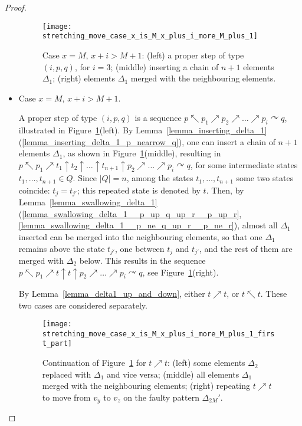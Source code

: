 \documentclass[12pt,a4paper]{article}
\theoremstyle{definition}
\begin{document}
\begin{proof}
\begin{itemize}
\begin{figure}[t]
	\centerline{\texttt{[image: stretching\_move\_case\_x\_is\_M\_x\_plus\_i\_more\_M\_plus\_1]}}
	\caption{Case $x = M$, $x+i > M+1$:
	(left) a proper step of type $(i,p,q)$, for $i=3$;
	(middle) inserting a chain of $n+1$ elements $\Delta_1$;
	(right) elements $\Delta_1$ merged with the neighbouring elements.}
	\label{f:stretching_move_case_x_is_M_x_plus_i_more_M_plus_1}
\end{figure}

\item
	Case $x = M$, $x+i > M+1$.
	
	A proper step of type $(i,p,q)$ is a sequence
	$p \nwarrow p_1 \nearrow p_2 \nearrow \ldots \nearrow p_i \curvearrowright q$,
	illustrated in Figure~\ref{f:stretching_move_case_x_is_M_x_plus_i_more_M_plus_1}(left).
	By Lemma~\ref{lemma_inserting_delta_1}(\ref{lemma_inserting_delta_1_p_nearrow_q}),
	one can insert a chain of $n+1$ elements $\Delta_1$,
	as shown in Figure~\ref{f:stretching_move_case_x_is_M_x_plus_i_more_M_plus_1}(middle),
	resulting in
	$p \nwarrow p_1 \nearrow t_1 \uparrow t_2 \uparrow \ldots \uparrow t_{n+1} \uparrow p_2 \nearrow \ldots \nearrow p_i \curvearrowright q$,
	for some intermediate states $t_1, \ldots, t_{n+1} \in Q$.
	Since $|Q| = n$, among the states $t_1, \ldots, t_{n+1}$
	some two states coincide: $t_j=t_{j'}$;
	this repeated state is denoted by $t$.
	Then, by Lemma~\ref{lemma_swallowing_delta_1}(\ref{lemma_swallowing_delta_1__p_up_q_up_r__p_up_r},\ref{lemma_swallowing_delta_1__p_ne_q_up_r__p_ne_r}),
	almost all $\Delta_1$ inserted
	can be merged into the neighbouring elements,
	so that one $\Delta_1$ remains above the state $t_{j'}$,
	one between $t_j$ and $t_{j'}$,
	and the rest of them are merged with $\Delta_2$ below.
	This results in the sequence
	$p \nwarrow p_1 \nearrow t \uparrow t \uparrow p_2 \nearrow \ldots \nearrow p_i \curvearrowright q$,
	see Figure~\ref{f:stretching_move_case_x_is_M_x_plus_i_more_M_plus_1}(right).
	
	By Lemma~\ref{lemma_delta1_up_and_down},
	either $t \nearrow t$, or $t \nwarrow t$.
	These two cases are considered separately.
	
\begin{figure}[t]
	\centerline{\texttt{[image: stretching\_move\_case\_x\_is\_M\_x\_plus\_i\_more\_M\_plus\_1\_first\_part]}}
	\caption{Continuation of Figure~\ref{f:stretching_move_case_x_is_M_x_plus_i_more_M_plus_1}
	for $t \nearrow t$:
	(left) some elements $\Delta_2$ replaced with $\Delta_1$ and vice versa;
	(middle) all elements $\Delta_1$ merged with the neighbouring elements;
	(right) repeating $t \nearrow t$ to move from $v_y$ to $v_z$ 
	on the faulty pattern $\Delta_{2M}'$.}
	\label{f:stretching_move_case_x_is_M_x_plus_i_more_M_plus_1_first_part}
\end{figure}


\end{itemize}
\end{proof}
\end{document}
